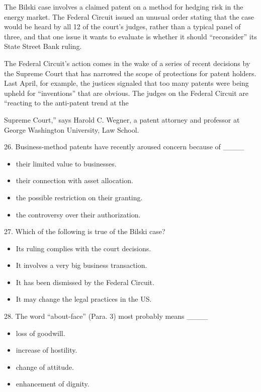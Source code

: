 \documentclass[UTF8,11pt]{ctexart}
\begin{document}
The Bilski case involves a claimed patent on a method for hedging risk in the energy market. The Federal Circuit issued an unusual order stating that the case would be heard by all 12 of the court’s judges, rather than a typical panel of three, and that one issue it wants to evaluate is whether it should “reconsider” its State Street Bank ruling.


The Federal Circuit’s action comes in the wake of a series of recent decisions by the Supreme Court that has narrowed the scope of protections for patent holders. Last April, for example, the justices signaled that too many patents were being upheld for “inventions” that are obvious. The judges on the Federal Circuit are “reacting to the anti-patent trend at the


Supreme Court,” says Harold C. Wegner, a patent attorney and professor at George Washington University, Law School.


26. Business-method patents have recently aroused concern because of \_\_\_\_


\begin{itemize}[leftmargin=2em,itemsep=.2em,topsep=.4em]\item[A.] their limited value to businesses.
\item[B.] their connection with asset allocation.
\item[C.] the possible restriction on their granting.
\item[D.] the controversy over their authorization.
\end{itemize}

27. Which of the following is true of the Bilski case?


\begin{itemize}[leftmargin=2em,itemsep=.2em,topsep=.4em]\item[A.] Its ruling complies with the court decisions.
\item[B.] It involves a very big business transaction.
\item[C.] It has been dismissed by the Federal Circuit.
\item[D.] It may change the legal practices in the US.
\end{itemize}

28. The word “about-face” (Para. 3) most probably means \_\_\_\_


\begin{itemize}[leftmargin=2em,itemsep=.2em,topsep=.4em]\item[A.] loss of goodwill.
\item[B.] increase of hostility.
\item[C.] change of attitude.
\item[D.] enhancement of dignity.
\end{itemize}
\end{document}
